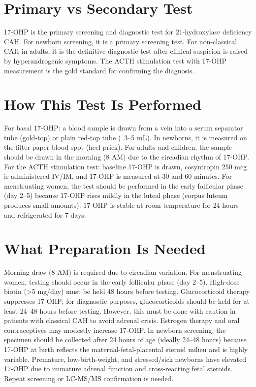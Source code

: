 \section*{Primary vs Secondary Test}
17-OHP is the primary screening and diagnostic test for 21-hydroxylase deficiency CAH. For newborn screening, it is a primary screening test. For non-classical CAH in adults, it is the definitive diagnostic test after clinical suspicion is raised by hyperandrogenic symptoms. The ACTH stimulation test with 17-OHP measurement is the gold standard for confirming the diagnosis.

\section*{How This Test Is Performed}
For basal 17-OHP: a blood sample is drawn from a vein into a serum separator tube (gold-top) or plain red-top tube (~3--5 mL). In newborns, it is measured on the filter paper blood spot (heel prick). For adults and children, the sample should be drawn in the morning (8 AM) due to the circadian rhythm of 17-OHP. For the ACTH stimulation test: baseline 17-OHP is drawn, cosyntropin 250 mcg is administered IV/IM, and 17-OHP is measured at 30 and 60 minutes. For menstruating women, the test should be performed in the early follicular phase (day 2--5) because 17-OHP rises mildly in the luteal phase (corpus luteum produces small amounts). 17-OHP is stable at room temperature for 24 hours and refrigerated for 7 days.

\section*{What Preparation Is Needed}
Morning draw (8 AM) is required due to circadian variation. For menstruating women, testing should occur in the early follicular phase (day 2--5). High-dose biotin (>5 mg/day) must be held 48 hours before testing. Glucocorticoid therapy suppresses 17-OHP; for diagnostic purposes, glucocorticoids should be held for at least 24--48 hours before testing. However, this must be done with caution in patients with classical CAH to avoid adrenal crisis. Estrogen therapy and oral contraceptives may modestly increase 17-OHP. In newborn screening, the specimen should be collected after 24 hours of age (ideally 24--48 hours) because 17-OHP at birth reflects the maternal-fetal-placental steroid milieu and is highly variable. Premature, low-birth-weight, and stressed/sick newborns have elevated 17-OHP due to immature adrenal function and cross-reacting fetal steroids. Repeat screening or LC-MS/MS confirmation is needed.

